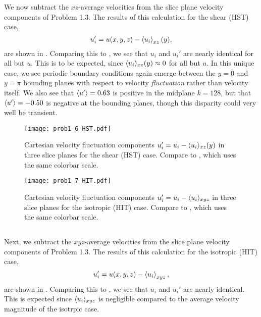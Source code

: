 \documentclass[11pt]{article}
\begin{document}
We now subtract the $xz$-average velocities from the slice plane velocity components of Problem 1.3. The results of this calculation for the shear (HST) case,
\begin{equation}
u_i' = u(x,y,z) - \left< u_i \right>_{xz}(y)
,
\end{equation}
are shown in . Comparing this to , we see that $u_i$ and $u_i'$ are nearly identical for all but $u$. This is to be expected, since $\langle u_i \rangle_{xz}(y) \approx 0$ for all but $u$. In this unique case, we see periodic boundary conditions again emerge between the $y=0$ and $y=\pi$ bounding planes with respect to velocity \emph{fluctuation} rather than velocity itself. We also see that $\langle u' \rangle=0.63$ is positive in the midplane $k=128$, but that $\langle u' \rangle=-0.50$ is negative at the bounding planes, though this disparity could very well be transient.

\begin{figure}[h!]
\centering
\texttt{[image: prob1\_6\_HST.pdf]}
\\[6pt]
\caption{Cartesian velocity fluctuation components $u_i' = u_i - \langle u_i \rangle_{xz}(y)$ in three slice planes for the shear (HST) case. Compare to , which uses the same colorbar scale.}
\label{fig:prob_1_6_slices}
\end{figure}

\begin{figure}[h!]
\centering
\texttt{[image: prob1\_7\_HIT.pdf]}
\\[6pt]
\caption{Cartesian velocity fluctuation components $u_i' = u_i - \langle u_i \rangle_{xyz}$ in three slice planes for the isotropic (HIT) case. Compare to , which uses the same colorbar scale.}
\label{fig:prob_1_7_slices}
\end{figure}

\subsection{}

Next, we subtract the $xyz$-average velocities from the slice plane velocity components of Problem 1.3. The results of this calculation for the isotropic (HIT) case,
\begin{equation}
u_i' = u(x,y,z) - \left< u_i \right>_{xyz}
,
\end{equation}
are shown in . Comparing this to , we see that $u_i$ and $u_i'$ are nearly identical. This is expected since $\langle u_i \rangle_{xyz}$ is negligible compared to the average velocity magnitude of the isotrpic case.
\end{document}
